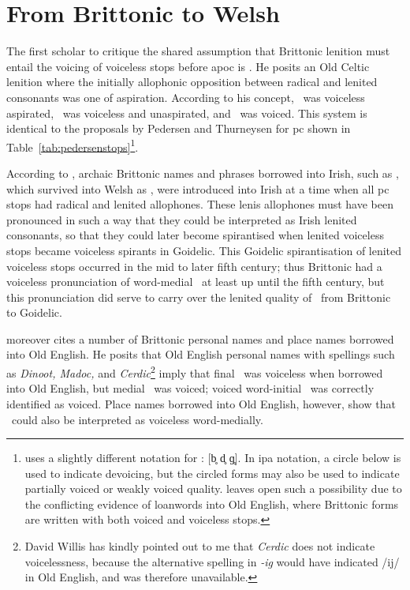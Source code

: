 \section{From Brittonic to Welsh}
\label{sec:from-brittonic-welsh}
The first scholar to critique the shared assumption that Brittonic lenition must entail the voicing of voiceless stops before \gls{apoc} is \textcite{koch_*cothairche_1990}. He posits an Old Celtic lenition where the initially allophonic opposition between radical and lenited consonants was one of aspiration.  According to his concept, \xT\ was voiceless aspirated, \lT\ was voiceless and unaspirated, and \xD\ was voiced. This system is identical to the proposals by Pedersen and Thurneysen for \gls{pc} shown in Table~\ref{tab:pedersenstops}\footnote{\Textcite{koch_*cothairche_1990} uses a slightly different notation for \lT: [b̥ d̥ ɡ̥]. In \gls{ipa} notation, a circle below is used to indicate devoicing, but the circled forms may also be used to indicate partially voiced or weakly voiced quality. \Textcite[§~29]{koch_*cothairche_1990} leaves open such a possibility due to the conflicting evidence of loanwords into Old English, where Brittonic forms are written with both voiced and voiceless stops.}.

According to \textcite{koch_*cothairche_1990}, archaic Brittonic names and phrases borrowed into Irish, such as , which survived into Welsh as , were introduced into Irish at a time when all \gls{pc} stops had radical and lenited allophones. These lenis allophones must have been pronounced in such a way that they could be interpreted as Irish lenited consonants, so that they could later become spirantised when lenited voiceless stops became voiceless spirants in Goidelic. This Goidelic spirantisation of lenited voiceless stops occurred in the mid to later fifth century; thus Brittonic had a voiceless pronunciation of word-medial \lT\ at least up until the fifth century, but this pronunciation did serve to carry over the lenited quality of \lT\ from Brittonic to Goidelic.

\Textcite{koch_*cothairche_1990} moreover cites a number of Brittonic personal names and place names borrowed into Old English. He posits that Old English personal names with spellings such as \textit{Dinoot, Madoc,} and \textit{Cerdic}\footnote{David Willis has kindly pointed out to me that \textit{Cerdic} does not indicate voicelessness, because the alternative spelling in \textit{-ig} would have indicated /ij/ in Old English, and was therefore unavailable.} imply that final \lT\ was voiceless when borrowed into Old English, but medial \lT\ was voiced; voiced word-initial \xD\ was correctly identified as voiced. Place names borrowed into Old English, however, show that \lT\ could also be interpreted as voiceless word-medially. %

